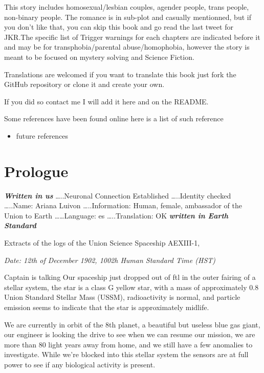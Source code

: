 \documentclass[colorlinks,12pt,a4paper]{book}
\begin{document}
    This story includes homosexual/lesbian couples, agender people, trans people, non-binary people. The romance is in sub-plot and casually 
    mentionned, but if you don't like that, you can skip this book and go read the last tweet for JKR.The specific list of Trigger warnings for 
    each chapters are indicated before it and may be for transphobia/parental abuse/homophobia, however the story is meant to be focused on 
    mystery solving and Science Fiction.\par 
    \bigskip

    Translations are welcomed if you want to translate this book just fork the GitHub repository or clone it and create your own.\par
    If you did so contact me I will add it here and on the README.

    Some references have been found online here is a list of such reference
    \begin{itemize}
      \item future references
    \end{itemize}



    \chapter*{Prologue}
    \textit{\textbf{Written in \gls{us}}}\newline
    …..Neuronal Connection Established\newline
    …..Identity checked\newline
    …..Name: Ariana Luivon\newline
    …..Information: Human, female, ambassador of the Union to Earth\newline
    ……Language: \gls{es}\newline
    …..Translation: OK\newline
    \textit{\textbf{written in Earth Standard}}\par
    \bigskip

Extracts of the logs of the Union Science Spaceship AEXIII-1,\par
\textit{Date: 12th of December 1902, 1002h Human Standard Time (HST)}\newline

Captain is talking\newline
Our spaceship just dropped out of \gls{ftl} in the outer fairing of a stellar system, 
the star is a class G yellow star, with a mass of approximately 0.8 Union Standard Stellar Mass (USSM), 
radioactivity is normal, and particle emission seems to indicate that the star is approximately midlife.\par
\bigskip
We are currently in orbit of the 8th planet, 
a beautiful but useless blue gas giant, 
our engineer is looking the drive to see when we can resume our mission, 
we are more than 80 light years away from home, and we still have a few anomalies to investigate. 
While we're blocked into this stellar system the sensors are at full power to see if any biological activity is present.\newline
\end{document}
